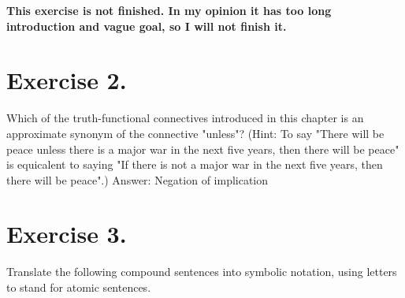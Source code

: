 \documentclass{article}
\begin{document}
\textbf{This exercise is not finished. In my opinion it has too long introduction and vague goal, so I will not finish it.}

\section*{Exercise 2.}
Which of the truth-functional connectives introduced in this chapter is an approximate synonym of the connective "unless"? (Hint: To say "There will be peace unless there is a major war in the next five years, then there will be peace" is equicalent to saying "If there is not a major war in the next five years, then there will be peace".)
\singlespace
Answer: Negation of implication

\section*{Exercise 3.}

Translate the following compound sentences into symbolic notation, using letters to stand for atomic sentences. 
\end{document}

